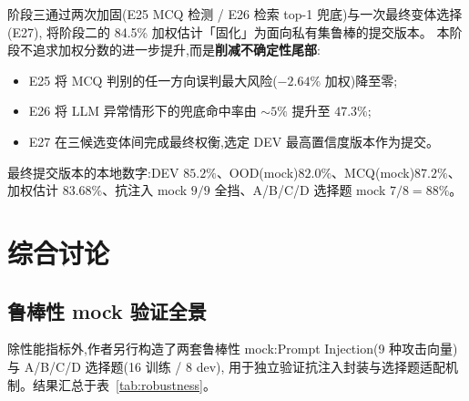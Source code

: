\documentclass[11pt,a4paper]{ctexart}
\begin{document}
阶段三通过两次加固(E25 MCQ 检测 / E26 检索 top-1 兜底)与一次最终变体选择(E27),
将阶段二的 84.5\% 加权估计「固化」为面向私有集鲁棒的提交版本。
本阶段不追求加权分数的进一步提升,而是\textbf{削减不确定性尾部}:

\begin{itemize}[leftmargin=2em,itemsep=0.1em]
\item E25 将 MCQ 判别的任一方向误判最大风险($-2.64\%$ 加权)降至零;
\item E26 将 LLM 异常情形下的兜底命中率由 $\sim 5\%$ 提升至 $47.3\%$;
\item E27 在三候选变体间完成最终权衡,选定 DEV 最高置信度版本作为提交。
\end{itemize}

\noindent 最终提交版本的本地数字:DEV $85.2\%$、OOD(mock)$82.0\%$、MCQ(mock)$87.2\%$、
加权估计 $83.68\%$、抗注入 mock $9/9$ 全挡、A/B/C/D 选择题 mock $7/8 = 88\%$。

\section{综合讨论}\label{sec:discussion}

\subsection{鲁棒性 mock 验证全景}

除性能指标外,作者另行构造了两套鲁棒性 mock:Prompt Injection(9 种攻击向量)与 A/B/C/D 选择题(16 训练 / 8 dev),
用于独立验证抗注入封装与选择题适配机制。结果汇总于表~\ref{tab:robustness}。
\end{document}
